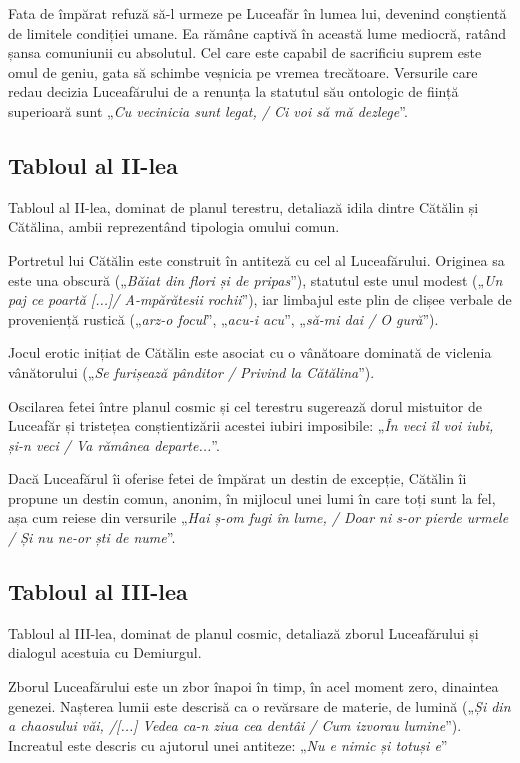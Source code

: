 \documentclass{article}
\newcommand{\qu}[1]{„\emph{#1}”}
\begin{document}
Fata de împărat refuză să-l urmeze pe Luceafăr în lumea lui, devenind conștientă de limitele condiției umane. Ea rămâne captivă în această lume mediocră, ratând șansa comuniunii cu absolutul. Cel care este capabil de sacrificiu suprem este omul de geniu, gata să schimbe veșnicia pe vremea trecătoare. Versurile care redau decizia Luceafărului de a renunța la statutul său ontologic de ființă superioară sunt \qu{Cu vecinicia sunt legat, / Ci voi să mă dezlege}.
\subsection{Tabloul al II-lea}
Tabloul al II-lea, dominat de planul terestru, detaliază idila dintre Cătălin și Cătălina, ambii reprezentând tipologia omului comun.

Portretul lui Cătălin este construit în antiteză cu cel al Luceafărului. Originea sa este una obscură (\qu{Băiat din flori și de pripas}), statutul este unul modest (\qu{Un paj ce poartă [...]/ A-mpărătesii rochii}), iar limbajul este plin de clișee verbale de proveniență rustică (\qu{arz-o focul}, \qu{acu-i acu}, \qu{să-mi dai / O gură}).

Jocul erotic inițiat de Cătălin este asociat cu o vânătoare dominată de viclenia vânătorului (\qu{Se furișează pânditor / Privind la Cătălina}).

Oscilarea fetei între planul cosmic și cel terestru sugerează dorul mistuitor de Luceafăr și tristețea conștientizării acestei iubiri imposibile: \qu{În veci îl voi iubi, și-n veci / Va rămânea departe...}.

Dacă Luceafărul îi oferise fetei de împărat un destin de excepție, Cătălin îi propune un destin comun, anonim, în mijlocul unei lumi în care toți sunt la fel, așa cum reiese din versurile \qu{Hai ș-om fugi în lume, / Doar ni s-or pierde urmele / Și nu ne-or ști de nume}.

\subsection{Tabloul al III-lea}
Tabloul al III-lea, dominat de planul cosmic, detaliază zborul Luceafărului și dialogul acestuia cu Demiurgul.

Zborul Luceafărului este un zbor înapoi în timp, în acel moment zero, dinaintea genezei. Nașterea lumii este descrisă ca o revărsare de materie, de lumină (\qu{Și din a chaosului văi, /[...] Vedea ca-n ziua cea dentâi / Cum izvorau lumine}). Increatul este descris cu ajutorul unei antiteze: \qu{Nu e nimic și totuși e}
\end{document}
